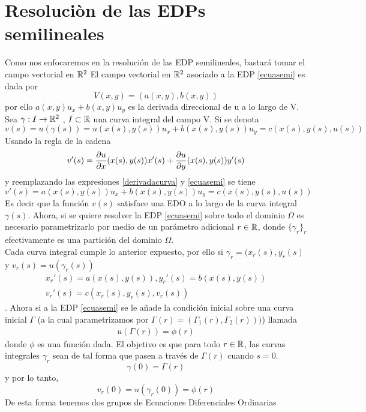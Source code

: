 \section{Resoluciòn de las EDPs semilineales}
Como nos enfocaremos en la resolución de las EDP semilineales, bastará tomar el campo vectorial en ${\mathbb{R}}^2$
El campo vectorial en ${\mathbb{R}}^2$ asociado a la EDP \ref{ecuasemi} es dada por 
$$V(x,y)=(a(x,y),b(x,y))$$
por ello $a(x,y)u_x+b(x,y)u_y$ es la derivada direccional de u a lo largo de V.\\
Sea  $\gamma:I\rightarrow{\mathbb{R}}^2$ , $I\subset{\mathbb{R}}$ una curva integral del campo V.
Si se denota $v(s)=u(\gamma(s))=u(x(s),y(s))u_x+b(x(s),y(s))u_y=c(x(s),y(s),u(s))$
Usando la regla de la cadena $$v'(s)=\frac{\partial u}{\partial x}(x(s),y(s))x'(s)+\frac{\partial u}{\partial y}(x(s),y(s))y'(s)$$ y reemplazando las expresiones \ref{derivadacurva} y \ref{ecuasemi} se tiene $$v'(s)=a(x(s),y(s))u_x+b(x(s),y(s))u_y=c(x(s),y(s),u(s))$$
Es decir que la función $v(s)$ satisface una EDO a lo largo de la curva integral $\gamma(s)$.
Ahora, si se quiere resolver la EDP \ref{ecuasemi} sobre todo el dominio $\Omega$ es necesario parametrizarlo por medio de un parámetro adicional $r\in{\mathbb{R}}$, donde $\{\gamma_r\}_r$ efectivamente es una partición del dominio $\Omega$. \\
Cada curva integral cumple lo anterior expuesto, por ello si $\gamma_r=(x_r(s),y_r(s)$ y $v_r(s)=u(\gamma_r(s))$
\begin{eqnarray*}
x_r'(s)=a(x(s),y(s)), y_r'(s)=b(x(s),y(s))\label{derivadacurvar}\\
v_r'(s)=c(x_r(s),y_r(s),v_r(s))
\end{eqnarray*}.
Ahora si a la EDP \ref{ecuasemi} se le añade la condición inicial sobre una curva inicial $\Gamma$ (a la cual parametrizamos por $\Gamma(r)=(\Gamma_1(r),\Gamma_2(r)))$)
llamada 
\begin{eqnarray}
u(\Gamma(r))=\phi(r) \label{condinicial}
\end{eqnarray}
donde $\phi$ es una función dada.
El objetivo es que para todo $r\in{\mathbb{R}}$, las curvas integrales $\gamma_r$  sean de tal forma que pasen a través de $\Gamma(r)$ cuando $s=0$.
$$\gamma(0)=\Gamma(r)$$
y por lo tanto,
$$v_r(0)=u(\gamma_r(0))=\phi(r)$$
De esta forma tenemos dos grupos de Ecuaciones Diferenciales Ordinarias
